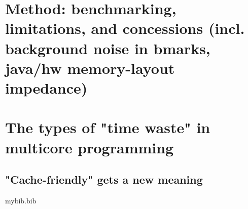 \documentclass[a4paper, titlepage]{article}
\renewcommand{\%}{\scalebox{.9}{\oldpct}}
\begin{document}
\section{Method: benchmarking, limitations, and concessions (incl. background
noise in bmarks, java/hw memory-layout impedance)}

\section{The types of "time waste" in multicore programming}
\subsection{"Cache-friendly" gets a new meaning}

\pagebreak


\begin{filecontents}{mybib.bib}
\end{filecontents}

\clearpage


\end{document}
